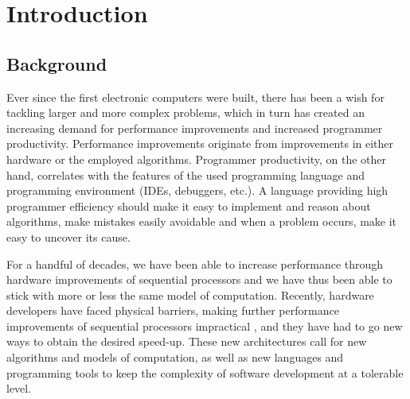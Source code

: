 
\chapter{Introduction}
\section{Background}
Ever since the first electronic computers were built, there has been a
wish for tackling larger and more complex problems, which in turn has
created an increasing demand for performance improvements and
increased programmer productivity. Performance improvements originate
from improvements in either hardware or the employed
algorithms. Programmer productivity, on the other hand, correlates
with the features of the used programming language and programming
environment (IDEs, debuggers, etc.). A language providing high
programmer efficiency should make it easy to implement and reason
about algorithms, make mistakes easily avoidable and when a problem
occurs, make it easy to uncover its cause.

For a handful of decades, we have been able to increase performance
through hardware improvements of sequential processors and we have
thus been able to stick with more or less the same model of
computation. Recently, hardware developers have faced physical
barriers, making further performance improvements of sequential
processors impractical \cite{sutter2006freelunchisover}, and they have
had to go new ways to obtain the desired speed-up. These new
architectures call for new algorithms and models of computation, as
well as new languages and programming tools to keep the complexity of
software development at a tolerable level.

